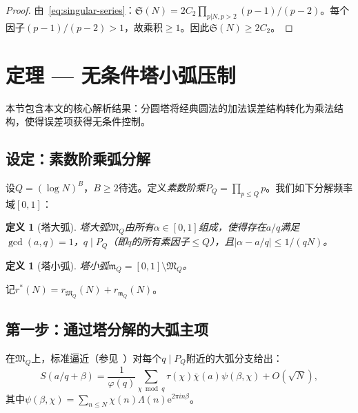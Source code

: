 \documentclass[11pt,a4paper]{article}
\newtheorem{definition}[theorem]{定义}
\theoremstyle{remark}
\newcommand{\mM}{\mathfrak{M}}
\newcommand{\mm}{\mathfrak{m}}
\newcommand{\e}{\mathrm{e}}
\begin{document}
\begin{proof}
由~\eqref{eq:singular-series}：$\mathfrak{S}(N) = 2C_2 \prod_{p|N, p>2}(p-1)/(p-2)$。每个因子$(p-1)/(p-2) > 1$，故乘积$\geq 1$。因此$\mathfrak{S}(N) \geq 2C_2$。
\end{proof}

\section{定理 --- 无条件塔小弧压制}
\label{sec:tower-suppression}

本节包含本文的核心解析结果：分圆塔将经典圆法的加法误差结构转化为乘法结构，使得误差项获得无条件控制。

\subsection{设定：素数阶乘弧分解}
\label{subsec:primorial-arcs}

设$Q = (\log N)^B$，$B \geq 2$待选。定义\emph{素数阶乘}$P_Q = \prod_{p \leq Q} p$。我们如下分解频率域$[0,1]$：

\begin{definition}[塔大弧]
\label{def:tower-major}
\emph{塔大弧}$\mM_Q$由所有$\alpha \in [0,1]$组成，使得存在$a/q$满足$\gcd(a,q)=1$，$q \mid P_Q$（即$q$的所有素因子$\leq Q$），且$|\alpha - a/q| \leq 1/(qN)$。
\end{definition}

\begin{definition}[塔小弧]
\label{def:tower-minor}
\emph{塔小弧}$\mm_Q = [0,1] \setminus \mM_Q$。
\end{definition}

记$r^*(N) = r_{\mM_Q}(N) + r_{\mm_Q}(N)$。

\subsection{第一步：通过塔分解的大弧主项}
\label{subsec:major-main}

在$\mM_Q$上，标准逼近（参见~\cite[第12--13章]{Davenport2000}）对每个$q \mid P_Q$附近的大弧分支给出：
\begin{equation}
\label{eq:S-approx}
  S(a/q+\beta) = \frac{1}{\varphi(q)}\sum_{\chi\bmod q}\tau(\chi)\bar{\chi}(a)
    \psi(\beta,\chi) + O(\sqrt{N}),
\end{equation}
其中$\psi(\beta,\chi) = \sum_{n \leq N}\chi(n)\Lambda(n)\e^{2\pi i n\beta}$。
\end{document}
